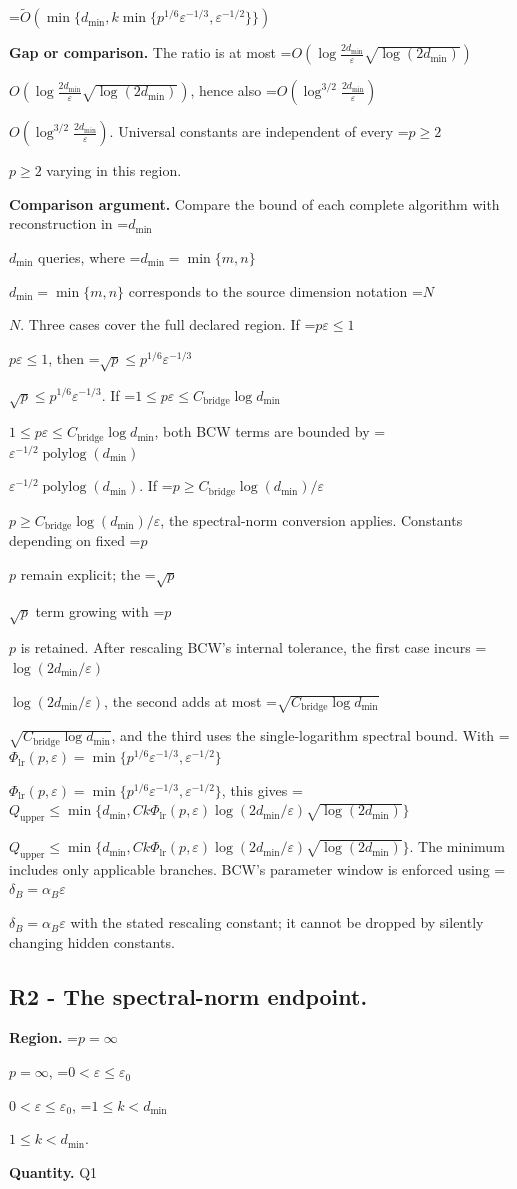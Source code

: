 \documentclass[10pt,a4paper]{article}
\newcommand{\AtlasMath}[1]{\par\begingroup\centering\setbox0=\hbox{$\displaystyle #1$}\ifdim\wd0>1.4\linewidth\typeout{ATLAS WIDE FORMULA: \the\wd0}\fi\ifdim\wd0>\linewidth\resizebox{\linewidth}{!}{\box0}\else\box0\fi\par\endgroup}
\newcommand{\AtlasInlineMath}[1]{\begingroup\setbox0=\hbox{$#1$}\ifdim\wd0>.4\linewidth\endgroup\AtlasMath{#1}\else\endgroup$#1$\fi}
\begin{document}
\AtlasMath{\widetilde{O}(\min\{d_{\mathrm{min}},k\min\{p^{1/6}\varepsilon^{-1/3},\varepsilon^{-1/2}\}\})}
\textbf{Gap or comparison.} The ratio is at most \AtlasInlineMath{O\!\left(\log\!\frac{2d_{\mathrm{min}}}{\varepsilon}\sqrt{\log(2d_{\mathrm{min}})}\right)}, hence also \AtlasInlineMath{O\!\left(\log^{3/2}\!\frac{2d_{\mathrm{min}}}{\varepsilon}\right)}. Universal constants are independent of every \AtlasInlineMath{p\ge2} varying in this region.

\textbf{Comparison argument.} Compare the bound of each complete algorithm with reconstruction in \AtlasInlineMath{d_{\mathrm{min}}} queries, where \AtlasInlineMath{d_{\mathrm{min}}=\min\{m,n\}} corresponds to the source dimension notation \AtlasInlineMath{N}. Three cases cover the full declared region. If \AtlasInlineMath{p\varepsilon\le1}, then \AtlasInlineMath{\sqrt p\le p^{1/6}\varepsilon^{-1/3}}. If \AtlasInlineMath{1\le p\varepsilon\le C_{\mathrm{bridge}}\log d_{\mathrm{min}}}, both BCW terms are bounded by \AtlasInlineMath{\varepsilon^{-1/2}\operatorname{polylog}(d_{\mathrm{min}})}. If \AtlasInlineMath{p\ge C_{\mathrm{bridge}}\log(d_{\mathrm{min}})/\varepsilon}, the spectral-norm conversion applies. Constants depending on fixed \AtlasInlineMath{p} remain explicit; the \AtlasInlineMath{\sqrt p} term growing with \AtlasInlineMath{p} is retained. After rescaling BCW's internal tolerance, the first case incurs \AtlasInlineMath{\log(2d_{\mathrm{min}}/\varepsilon)}, the second adds at most \AtlasInlineMath{\sqrt{C_{\mathrm{bridge}}\log d_{\mathrm{min}}}}, and the third uses the single-logarithm spectral bound. With \AtlasInlineMath{\Phi_{\mathrm{lr}}(p,\varepsilon)=\min\{p^{1/6}\varepsilon^{-1/3},\varepsilon^{-1/2}\}}, this gives \AtlasInlineMath{Q_{\mathrm{upper}}\le\min\{d_{\mathrm{min}},Ck\Phi_{\mathrm{lr}}(p,\varepsilon)\log(2d_{\mathrm{min}}/\varepsilon)\sqrt{\log(2d_{\mathrm{min}})}\}}. The minimum includes only applicable branches. BCW's parameter window is enforced using \AtlasInlineMath{\delta_B=\alpha_B\varepsilon} with the stated rescaling constant; it cannot be dropped by silently changing hidden constants.

\subsection{R2 - The spectral-norm endpoint.}
\textbf{Region.} \AtlasInlineMath{p=\infty}, \AtlasInlineMath{0<\varepsilon\le\varepsilon_0}, \AtlasInlineMath{1\le k<d_{\mathrm{min}}}.

\textbf{Quantity.} Q1
\end{document}
